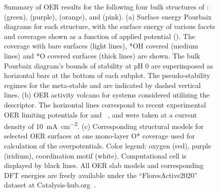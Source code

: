 \begin{figure}
\centering
{}
\caption{\label{fig:oer_volcano}
%
Summary of OER results for the following four bulk structures of \IrOx: \rIrOtwo (green), \aIrOthree (purple), \rIrOthree (orange), and \bIrOthree (pink).
%
(a) Surface energy Pourbaix diagrams for each structure, with the surface energy of various facets and coverages shown as a function of applied potential (\VRHE).
%
The coverage with bare surfaces (light lines), *OH covered (medium lines) and *O covered surfaces (thick lines) are shown.
%
The bulk Pourbaix diagram's bounds of stability at pH \num{0} are superimposed as horizontal bars at the bottom of each subplot.
%
The pseudo-stability regimes for the meta-stable \bIrOthree and \rIrOthree are indicated by dashed vertical lines.
%
(b) OER activity volcano for \IrOx systems considered utilizing the \DGOmOH{} descriptor.
%
The horizontal lines correspond to recent experimental OER limiting potentials for \IrOtwo and \IrOthree~\cite{Seitz2016}, and were taken at a current density of \SI[mode=text]{10}{\mA\per\cm\squared}.
%
(c) Corresponding structural models for selected OER surfaces at one mono-layer O* coverage used for calculation of the overpotentials.
%
Color legend: oxygen (red), purple (iridium), coordination motif (white).
%
Computational cell is displayed by black lines.
%
All OER slab models and corresponding DFT energies are freely available under the ``FloresActive2020''~\cite{upload_CatHub} dataset at Catalysis-hub.org~\cite{Winther2019}.
}
\end{figure}


